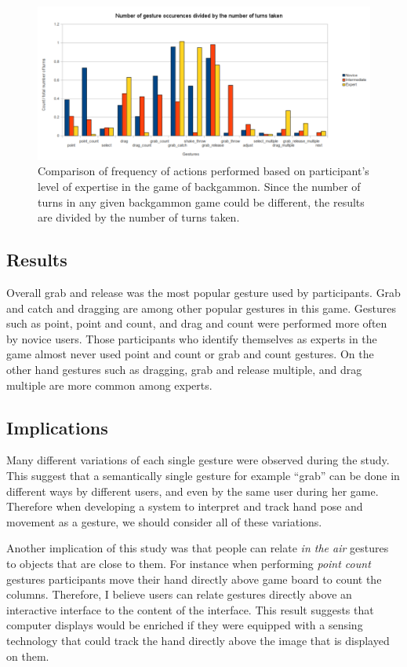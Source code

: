\begin{figure}[h]
 \centering
 \includegraphics[type=pdf,ext=.pdf,read=.pdf,width=6in]{./img/backgammon_chart}
 \caption[Comparison of frequency of actions performed based on participant's level of expertise in the game of backgammon.]{
Comparison of frequency of actions performed based on participant's level of expertise in the game of backgammon.  
Since the number of turns in any given backgammon game could be different, the results are divided by the number of turns taken. }
 \label{fig:backgammon_chart}
\end{figure}
\subsection{Results}
Overall grab and release was the most popular gesture used by participants. 
Grab and catch and dragging are among other popular gestures in this game. 
Gestures such as point, point and count, and drag and count were performed more often by novice users. 
Those participants who identify themselves as experts in the game almost never used point and count or grab and count gestures. 
On the other hand gestures such as dragging, grab and release multiple, and drag multiple are more common among experts.

\subsection{Implications}
Many different variations of each single gesture were observed during the study. 
This suggest that a semantically single gesture for example “grab” can be done in different ways by different users, and even by the same user during her game. 
Therefore when developing a system to interpret and track hand pose and movement as a gesture, we should consider all of these variations.

Another implication of this study was that people can relate \textit{in the air} gestures to objects that are close to them. 
For instance when performing \textit{point count} gestures participants move their hand directly above game board to count the columns.
Therefore, I believe users can relate gestures directly above an interactive interface to the content of the interface. 
This result suggests that computer displays would be enriched if they were equipped with a sensing technology that could track the hand directly above the image that is displayed on them.

